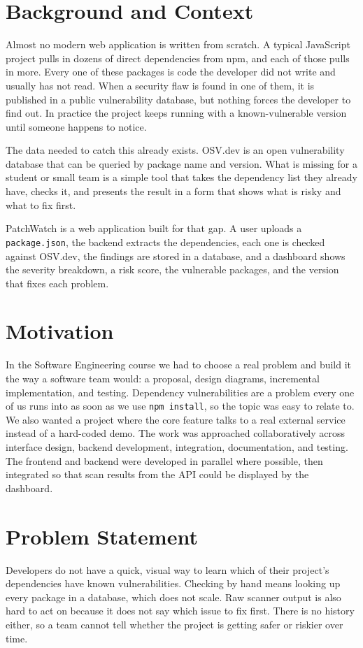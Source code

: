 \documentclass[12pt,a4paper]{report}
\begin{document}
\section{Background and Context}
Almost no modern web application is written from scratch. A typical JavaScript project pulls in dozens of direct dependencies from npm, and each of those pulls in more. Every one of these packages is code the developer did not write and usually has not read. When a security flaw is found in one of them, it is published in a public vulnerability database, but nothing forces the developer to find out. In practice the project keeps running with a known-vulnerable version until someone happens to notice.

The data needed to catch this already exists. OSV.dev is an open vulnerability database that can be queried by package name and version. What is missing for a student or small team is a simple tool that takes the dependency list they already have, checks it, and presents the result in a form that shows what is risky and what to fix first.

PatchWatch is a web application built for that gap. A user uploads a \texttt{package.json}, the backend extracts the dependencies, each one is checked against OSV.dev, the findings are stored in a database, and a dashboard shows the severity breakdown, a risk score, the vulnerable packages, and the version that fixes each problem.

\section{Motivation}
In the Software Engineering course we had to choose a real problem and build it the way a software team would: a proposal, design diagrams, incremental implementation, and testing. Dependency vulnerabilities are a problem every one of us runs into as soon as we use \texttt{npm install}, so the topic was easy to relate to. We also wanted a project where the core feature talks to a real external service instead of a hard-coded demo. The work was approached collaboratively across interface design, backend development, integration, documentation, and testing. The frontend and backend were developed in parallel where possible, then integrated so that scan results from the API could be displayed by the dashboard.

\section{Problem Statement}
Developers do not have a quick, visual way to learn which of their project's dependencies have known vulnerabilities. Checking by hand means looking up every package in a database, which does not scale. Raw scanner output is also hard to act on because it does not say which issue to fix first. There is no history either, so a team cannot tell whether the project is getting safer or riskier over time.
\end{document}
